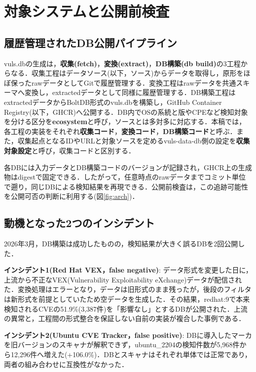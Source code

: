 \documentclass{css}
\begin{document}
\section{対象システムと公開前検査}
\label{sec:background}

\subsection{履歴管理されたDB公開パイプライン}
\label{sec:infra}

vuls.dbの生成は，\textbf{収集(fetch)}，\textbf{変換(extract)}，\textbf{DB構築(db build)}の3工程からなる\cite{nakaoka2025,vuls-data-update,vuls2,vuls-data-db}．収集工程はデータソース(以下，ソース)からデータを取得し，原形をほぼ保ったrawデータとしてGitで履歴管理する．変換工程はrawデータを共通スキーマへ変換し，extractedデータとして同様に履歴管理する．DB構築工程はextractedデータからBoltDB形式のvuls.dbを構築し，GitHub Container Registry(以下，GHCR)へ公開する．DB内でOSの系統と版やCPEなど検知対象を分ける区分を\textbf{ecosystem}と呼び，ソースとは多対多に対応する．本稿では，各工程の実装をそれぞれ\textbf{収集コード}，\textbf{変換コード}，\textbf{DB構築コード}と呼ぶ．また，収集起点となるIDやURLと対象ソースを定めるvuls-data-db側の設定を\textbf{収集対象設定}と呼び，収集コードと区別する．

各DBには入力データとDB構築コードのバージョンが記録され，GHCR上の生成物はdigestで固定できる．したがって，任意時点のrawデータまでコミット単位で遡り，同じDBによる検知結果を再現できる．公開前検査は，この追跡可能性を公開可否の判断に利用する(図\ref{fig:arch})．

\subsection{動機となった2つのインシデント}
\label{sec:incidents}

2026年3月，DB構築は成功したものの，検知結果が大きく誤るDBを2回公開した．

\textbf{インシデント1(Red Hat VEX，false negative)}:
データ形式を変更した日に，上流から不正なVEX(Vulnerability Exploitability eXchange)データが配信された．変換処理はエラーとなり，データは旧形式のまま残ったが，後段のフィルタは新形式を前提としていたため空データを生成した．その結果，redhat:9で本来検知されるCVEの51.9\%(3,387件)を「影響なし」とするDBが公開された．上流の異常と，工程間の形式整合を保証しない自前の実装が複合した事例である．

\textbf{インシデント2(Ubuntu CVE Tracker，\mbox{false} \mbox{positive})}:
DBに導入したマーカを旧バージョンのスキャナが解釈できず，ubuntu\_2204の検知件数が5,968件から12,296件へ増えた(+106.0\%)．DBとスキャナはそれぞれ単体では正常であり，両者の組み合わせに互換性がなかった．
\end{document}
